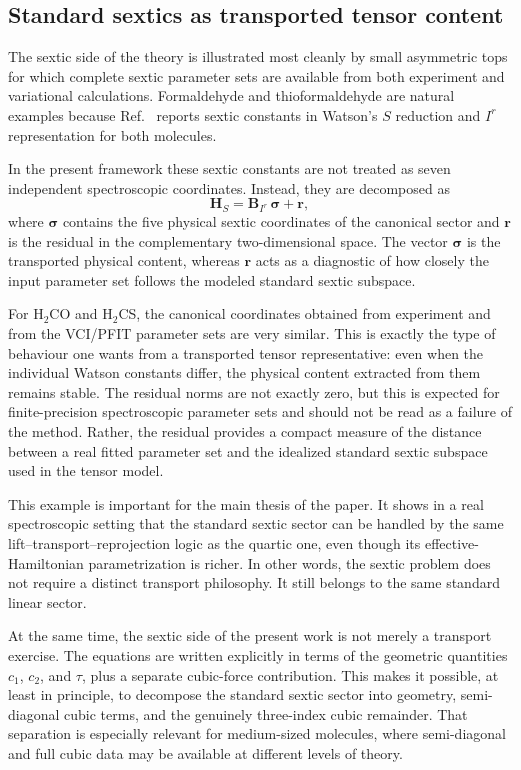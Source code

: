 \documentclass[aip,jcp,reprint,floatfix]{revtex4-2}
\begin{document}
\subsection{Standard sextics as transported tensor content}

The sextic side of the theory is illustrated most cleanly by small asymmetric
tops for which complete sextic parameter sets are available from both
experiment and variational calculations. Formaldehyde and thioformaldehyde are
natural examples because Ref.~ reports sextic constants in
Watson's $S$ reduction and $I^r$ representation for both molecules.

In the present framework these sextic constants are not treated as seven
independent spectroscopic coordinates. Instead, they are decomposed as
\begin{equation}
\mathbf H_S = \mathbf B_{I^r}\,\boldsymbol\sigma + \mathbf r,
\end{equation}
where $\boldsymbol\sigma$ contains the five physical sextic coordinates of the
canonical sector and $\mathbf r$ is the residual in the complementary
two-dimensional space. The vector $\boldsymbol\sigma$ is the transported
physical content, whereas $\mathbf r$ acts as a diagnostic of how closely the
input parameter set follows the modeled standard sextic subspace.

For H$_2$CO and H$_2$CS, the canonical coordinates obtained from experiment and
from the VCI/PFIT parameter sets are very similar. This is exactly the type of
behaviour one wants from a transported tensor representative: even when the
individual Watson constants differ, the physical content extracted from them
remains stable. The residual norms are not exactly zero, but this is expected
for finite-precision spectroscopic parameter sets and should not be read as a
failure of the method. Rather, the residual provides a compact measure of the
distance between a real fitted parameter set and the idealized standard sextic
subspace used in the tensor model.

This example is important for the main thesis of the paper. It shows in a real
spectroscopic setting that the standard sextic sector can be handled by the
same lift--transport--reprojection logic as the quartic one, even though its
effective-Hamiltonian parametrization is richer. In other words, the sextic
problem does not require a distinct transport philosophy. It still belongs to
the same standard linear sector.

At the same time, the sextic side of the present work is not merely a
transport exercise. The equations are written explicitly in terms of the
geometric quantities $c_1$, $c_2$, and $\tau$, plus a separate cubic-force
contribution. This makes it possible, at least in principle, to decompose the
standard sextic sector into geometry, semi-diagonal cubic terms, and the
genuinely three-index cubic remainder. That separation is especially relevant
for medium-sized molecules, where semi-diagonal and full cubic data may be
available at different levels of theory.
\end{document}
